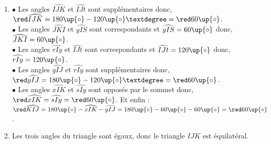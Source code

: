 \begin{corrige}
\ \\ [-5mm]
   \begin{enumerate}
      \item $\bullet$ Les angles $\widehat{IJK}$ et $\widehat{IJt}$ sont supplémentaires donc, ${\red \widehat{IJK}} =180\up{\circ}-120\up{\circ}° ={\red 60\up{\circ}}$. \\
         $\bullet$ Les angles $\widehat{JKI}$ et $\widehat{yIS}$ sont correspondants et $\widehat{yIS} =60\up{\circ}$ donc, {\red $\widehat{JKI} =60\up{\circ}$}. \\
         $\bullet$ Les angles $\widehat{rIy}$ et $\widehat{IJt}$ sont correspondants et $\widehat{IJt} =120\up{\circ}$ donc, {\red $\widehat{rIy} =120\up{\circ}$}. \\
         $\bullet$ Les angles $\widehat{yIJ}$ et $\widehat{rIy}$ sont supplémentaires donc, ${\red \widehat{yIJ}} =180\up{\circ}-120\up{\circ}° ={\red 60\up{\circ}}$. \\
         $\bullet$ Les angles $\widehat{xIK}$ et $\widehat{sIy}$ sont opposés par le sommet donc, ${\red \widehat{xIK}} =\widehat{sIy} ={\red 60\up{\circ}}$. Et enfin : \\
         ${\red \widehat{KIJ}} =180\up{\circ} -\widehat{xIK}-\widehat{yIJ} =180\up{\circ}-60\up{\circ}-60\up{\circ} ={\red 60\up{\circ}}$.
      \item Les trois angles du triangle sont égaux, donc {\red le triangle $IJK$ est équilatéral}.
   \end{enumerate}
\end{corrige}
 